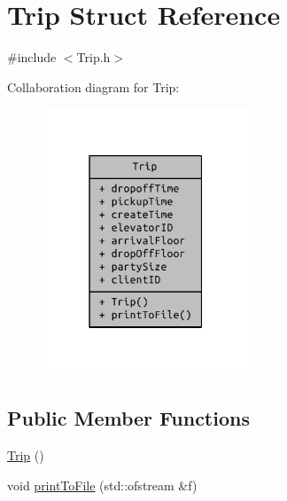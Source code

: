\hypertarget{struct_trip}{}\section{Trip Struct Reference}
\label{struct_trip}


{\ttfamily \#include $<$Trip.\+h$>$}



Collaboration diagram for Trip\+:
\nopagebreak
\begin{figure}[H]
\begin{center}
\leavevmode
\includegraphics[width=175pt]{struct_trip__coll__graph}
\end{center}
\end{figure}
\subsection*{Public Member Functions}
\begin{DoxyCompactItemize}
\item 
\hyperlink{struct_trip_aa67b77d0d2de622ed5eb9e9cad34db8f}{Trip} ()
\item 
void \hyperlink{struct_trip_a3238343db8bab2184a01b15f4c08f381}{print\+To\+File} (std\+::ofstream \&f)
\end{DoxyCompactItemize}
